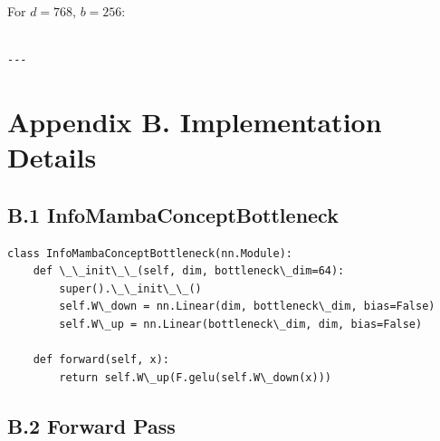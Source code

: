 For $d = 768$, $b = 256$:

\begin{lstlisting}

---
\end{lstlisting}

\section{Appendix B. Implementation Details}

\subsection{B.1 InfoMambaConceptBottleneck}

\begin{lstlisting}
class InfoMambaConceptBottleneck(nn.Module):
    def \_\_init\_\_(self, dim, bottleneck\_dim=64):
        super().\_\_init\_\_()
        self.W\_down = nn.Linear(dim, bottleneck\_dim, bias=False)
        self.W\_up = nn.Linear(bottleneck\_dim, dim, bias=False)
    
    def forward(self, x):
        return self.W\_up(F.gelu(self.W\_down(x)))
\end{lstlisting}

\subsection{B.2 Forward Pass}

